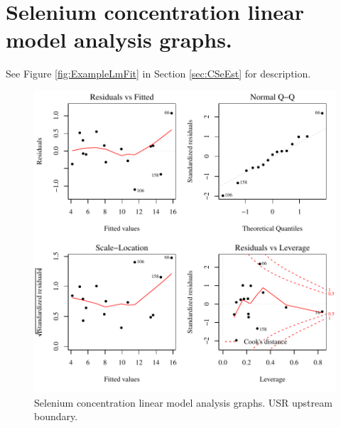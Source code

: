 \section{Selenium concentration linear model analysis graphs.}
\label{App:AppLmFit}

See Figure \ref{fig:ExampleLmFit} in Section \ref{sec:CSeEst} for description.

\begin{figure}[htbp]
	\begin{center}
	\includegraphics[width=6in]{"Figures/Results_USR/Conc Model lm-fit U163"}
	\caption{Selenium concentration linear model analysis graphs.  USR upstream boundary.}
	\end{center}
\end{figure}
\newpage

